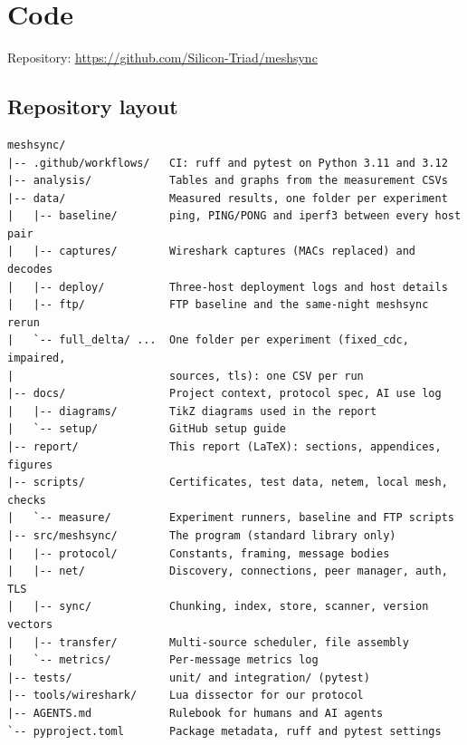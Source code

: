 \section{Code}
\label{app:code}

Repository: \url{https://github.com/Silicon-Triad/meshsync}


\subsection{Repository layout}
\begin{verbatim}
meshsync/
|-- .github/workflows/   CI: ruff and pytest on Python 3.11 and 3.12
|-- analysis/            Tables and graphs from the measurement CSVs
|-- data/                Measured results, one folder per experiment
|   |-- baseline/        ping, PING/PONG and iperf3 between every host pair
|   |-- captures/        Wireshark captures (MACs replaced) and decodes
|   |-- deploy/          Three-host deployment logs and host details
|   |-- ftp/             FTP baseline and the same-night meshsync rerun
|   `-- full_delta/ ...  One folder per experiment (fixed_cdc, impaired,
|                        sources, tls): one CSV per run
|-- docs/                Project context, protocol spec, AI use log
|   |-- diagrams/        TikZ diagrams used in the report
|   `-- setup/           GitHub setup guide
|-- report/              This report (LaTeX): sections, appendices, figures
|-- scripts/             Certificates, test data, netem, local mesh, checks
|   `-- measure/         Experiment runners, baseline and FTP scripts
|-- src/meshsync/        The program (standard library only)
|   |-- protocol/        Constants, framing, message bodies
|   |-- net/             Discovery, connections, peer manager, auth, TLS
|   |-- sync/            Chunking, index, store, scanner, version vectors
|   |-- transfer/        Multi-source scheduler, file assembly
|   `-- metrics/         Per-message metrics log
|-- tests/               unit/ and integration/ (pytest)
|-- tools/wireshark/     Lua dissector for our protocol
|-- AGENTS.md            Rulebook for humans and AI agents
`-- pyproject.toml       Package metadata, ruff and pytest settings
\end{verbatim}

